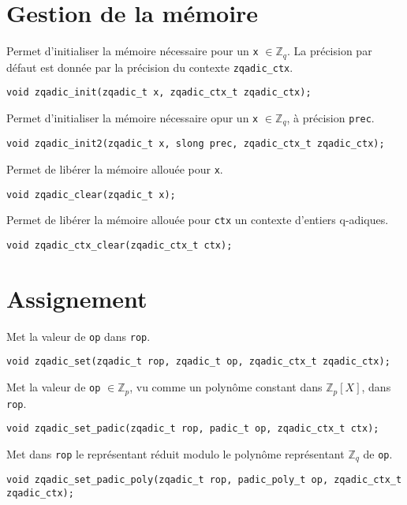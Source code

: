 \documentclass[11pt]{article}
\begin{document}
\section{Gestion de la mémoire}

Permet d'initialiser la mémoire nécessaire pour un \texttt{x} $\in \mathbb{Z}_q$. La précision par défaut est donnée par la précision du contexte \texttt{zqadic_ctx}. 
\begin{verbatim}
void zqadic_init(zqadic_t x, zqadic_ctx_t zqadic_ctx);
\end{verbatim}

Permet d'initialiser la mémoire nécessaire opur un \texttt{x} $\in \mathbb{Z}_q$, à précision \texttt{prec}. 
\begin{verbatim}
void zqadic_init2(zqadic_t x, slong prec, zqadic_ctx_t zqadic_ctx);
\end{verbatim}

Permet de libérer la mémoire allouée pour \texttt{x}. 
\begin{verbatim}
void zqadic_clear(zqadic_t x);
\end{verbatim}

Permet de libérer la mémoire allouée pour \texttt{ctx} un contexte d'entiers q-adiques. 
\begin{verbatim}
void zqadic_ctx_clear(zqadic_ctx_t ctx);
\end{verbatim}


\section{Assignement}

Met la valeur de \texttt{op} dans \texttt{rop}. 
\begin{verbatim}
void zqadic_set(zqadic_t rop, zqadic_t op, zqadic_ctx_t zqadic_ctx);
\end{verbatim}

Met la valeur de \texttt{op} $\in \mathbb{Z}_p$, vu comme un polynôme constant dans $\mathbb{Z}_p[X]$, dans \texttt{rop}. 
\begin{verbatim}
void zqadic_set_padic(zqadic_t rop, padic_t op, zqadic_ctx_t ctx);
\end{verbatim}

Met dans \texttt{rop} le représentant réduit modulo le polynôme représentant $\mathbb{Z}_q$ de \texttt{op}. 
\begin{verbatim}
void zqadic_set_padic_poly(zqadic_t rop, padic_poly_t op, zqadic_ctx_t zqadic_ctx);
\end{verbatim}
\end{document}
